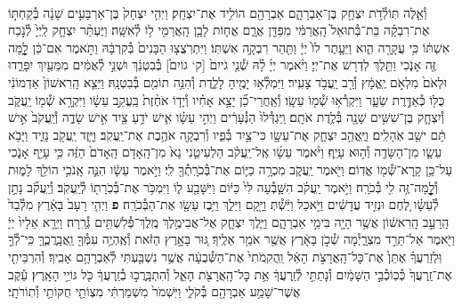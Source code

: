 \documentclass[twoside, openany, parskip=half, 11pt]{book}
\begin{document}
\begin{footnotesize}
\begin{multicols}{2}
\\
וְ֯אֵ֛לֶּה תּֽוֹלְ֯דֹ֥ת יִצְחָ֖ק בֶּן־אַבְרָהָ֑ם אַבְרָהָ֖ם הוֹלִ֥יד אֶת־יִצְחָֽק׃ וַיְהִ֤י יִצְחָק֙ בֶּן־אַרְבָּעִ֣ים שָׁנָ֔ה בְּ֯קַחְתּ֣וֹ אֶת־רִבְקָ֗ה בַּת־בְּ֯תוּאֵל֙ הָֽאֲרַמִּ֔י מִפַּדַּ֖ן אֲרָ֑ם אֲח֛וֹת לָבָ֥ן הָֽאֲרַמִּ֖י ל֥וֹ לְ֯אִשָּֽׁה׃ וַיֶּעְתַּ֨ר יִצְחָ֤ק לַֽיְיָ֙ לְ֯נֹ֣כַח אִשְׁתּ֔וֹ כִּ֥י עֲקָרָ֖ה הִ֑וא וַיֵּעָ֤תֶר לוֹ֙ יְיָ֔ וַתַּ֖הַר רִבְקָ֥ה אִשְׁתּֽוֹ׃ וַיִּתְרֹֽצֲצ֤וּ הַבָּנִים֙ בְּ֯קִרְבָּ֔הּ וַתֹּ֣אמֶר אִם־כֵּ֔ן לׇׇׇׇׇׇ֥מָּה זֶּ֖ה אָנֹ֑כִי וַתֵּ֖לֶךְ לִדְר֥שׁ אֶת־יְיָ׃  וַיֹּ֨אמֶר יְיָ֜ לָ֗הּ שְׁ֯נֵ֤י גֹייִם֙ [ק‘ גוֹיִם֙] בְּ֯בִטְנֵ֔ךְ וּשְׁנֵ֣י לְ֯אֻמִּ֔ים מִמֵּעַ֖יִךְ יִפָּרֵ֑דוּ וּלְאֹם֙ מִלְאֹ֣ם יֶֽאֱמָ֔ץ וְ֯רַ֖ב יַֽעֲבֹ֥ד צָעִֽיר׃ וַיִּמְלְ֯א֥וּ יָמֶ֖יהָ לָלֶ֑דֶת וְ֯הִנֵּ֥ה תוֹמִ֖ם בְּ֯בִטְנָֽהּ׃ וַיֵּצֵ֤א הָֽרִאשׁוֹן֙ אַדְמוֹנִ֔י כֻּלּ֖וֹ כְּ֯אַדֶּ֣רֶת שֵׂעָ֑ר וַיִּקְרְ֯א֥וּ שְׁ֯מ֖וֹ עֵשָֽׂו׃ וְ֯אַֽחֲרֵי־כֵ֞ן יָצָ֣א אָחִ֗יו וְ֯יָד֤וֹ אֹחֶ֨זֶת֙ בַּֽעֲקֵ֣ב עֵשָׂ֔ו וַיִּקְרָ֥א שְׁ֯מ֖וֹ יַֽעֲקֹ֑ב וְ֯יִצְחָ֛ק בֶּן־שִׁשִּׁ֥ים שָׁנָ֖ה בְּ֯לֶ֥דֶת אֹתָֽם׃  וַֽיִּגְדְּ֯לוּ֙ הַנְּ֯עָרִ֔ים וַיְהִ֣י עֵשָׂ֗ו אִ֛ישׁ יֹדֵ֥עַ צַ֖יִד אִ֣ישׁ שָׂדֶ֑ה וְ֯יַֽעֲקֹב֙ אִ֣ישׁ תָּ֔ם ישֵׁ֖ב אֹֽהָלִֽים׃ וַיֶּֽאֱהַ֥ב יִצְחָ֛ק אֶת־עֵשָׂ֖ו כִּי־צַ֣יִד בְּ֯פִ֑יו וְ֯רִבְקָ֖ה אֹהֶ֥בֶת אֶת־יַֽעֲקֹֽב׃ וַיָּ֥זֶד יַֽעֲקֹ֖ב נָזִ֑יד וַיָּבֹ֥א עֵשָׂ֛ו מִן־הַשָּׂדֶ֖ה וְ֯ה֥וּא עָיֵֽף׃ וַיֹּ֨אמֶר עֵשָׂ֜ו אֶֽל־יַֽעֲקֹ֗ב הַלְעִיטֵ֤נִי נָא֙ מִן־הָֽאָדֹ֤ם הָֽאָדֹם֙ הַזֶּ֔ה כִּ֥י עָיֵ֖ף אָנֹ֑כִי עַל־כֵּ֥ן קָֽרָא־שְׁ֯מ֖וֹ אֱדֽוֹם׃ וַיֹּ֖אמֶר יַֽעֲקֹ֑ב מִכְרָ֥ה כַיּ֛וֹם אֶת־בְּ֯כֹרָֽתְ֯ךָ֖ לִֽי׃ וַיֹּ֣אמֶר עֵשָׂ֔ו הִנֵּ֛ה אָֽנֹכִ֥י הוֹלֵ֖ךְ לָמ֑וּת וְ֯לׇׇׇׇׇׇׇׇׇׇׇׇׇׇׇׇֽמָּה־זֶּ֥ה לִ֖י בְּ֯כֹרָֽה׃ וַיֹּ֣אמֶר יַֽעֲקֹ֗ב הִשָּׁ֤בְ֯עָה לִּי֙ כַּיּ֔וֹם וַיִּשָּׁבַ֖ע ל֑וֹ וַיִּמְכֹּ֥ר אֶת־בְּ֯כֹֽרָת֖וֹ לְ֯יַֽעֲקֹֽב׃ וְ֯יַֽעֲקֹ֞ב נָתַ֣ן לְ֯עֵשָׂ֗ו לֶ֚חֶם וּנְזִ֣יד עֲדָשִׁ֔ים וַיֹּ֣אכַל וַיֵּ֔שְׁ֯תְּ וַיָּ֖קָם וַיֵּלַ֑ךְ וַיִּ֥בֶז עֵשָׂ֖ו אֶת־הַבְּ֯כֹרָֽה׃ \textbf{פ}
וַיְהִ֤י רָעָב֙ בָּאָ֔רֶץ מִלְּ֯בַד֙ הָֽרָעָ֣ב הָֽרִאשׁ֔וֹן אֲשֶׁ֥ר הָיָ֖ה בִּימֵ֣י אַבְרָהָ֑ם וַיֵּ֧לֶךְ יִצְחָ֛ק אֶל־אֲבִימֶ֥לֶךְ מֶֽלֶךְ־פְּ֯לִשְׁתִּ֖ים גְּ֯רָֽרָה׃ וַיֵּרָ֤א אֵלָיו֙ יְיָ֔ וַיֹּ֖אמֶר אַל־תֵּרֵ֣ד מִצְרָ֑יְ֯מָה שְׁ֯כֹ֣ן בָּאָ֔רֶץ אֲשֶׁ֖ר אֹמַ֥ר אֵלֶֽיךָ׃ גּ֚וּר בָּאָ֣רֶץ הַזֹּ֔את וְ֯אֶֽהְיֶ֥ה עִמְּ֯ךָ֖ וַֽאֲבָֽרֲכֶ֑ךָּ כִּֽי־לְ֯ךָ֣ וּֽלְזַרְעֲךָ֗ אֶתֵּן֙ אֶת־כׇּל־הָֽאֲרָצֹ֣ת הָאֵ֔ל וַֽהֲקִֽמֹתִי֙ אֶת־הַשְּׁ֯בֻעָ֔ה אֲשֶׁ֥ר נִשְׁבַּ֖עְתִּי לְ֯אַבְרָהָ֥ם אָבִֽיךָ׃ וְ֯הִרְבֵּיתִ֤י אֶת־זַֽרְעֲךָ֙ כְּ֯כֽוֹכְ֯בֵ֣י הַשָּׁמַ֔יִם וְ֯נָתַתִּ֣י לְ֯זַֽרְעֲךָ֔ אֵ֥ת כׇּל־הָֽאֲרָצֹ֖ת הָאֵ֑ל וְ֯הִתְבָּֽרֲכ֣וּ בְ֯זַֽרְעֲךָ֔ כֹּ֖ל גּוֹיֵ֥י הָאָֽרֶץ׃ עֵ֕קֶב אֲשֶׁר־שָׁמַ֥ע אַבְרָהָ֖ם בְּ֯קֹלִ֑י וַיִּשְׁמֹר֙ מִשְׁמַרְתִּ֔י מִצְוֹתַ֖י חֻקּוֹתַ֥י וְ֯תֽוֹרֹתָֽי׃


\end{multicols}
\end{footnotesize}
\end{document}
